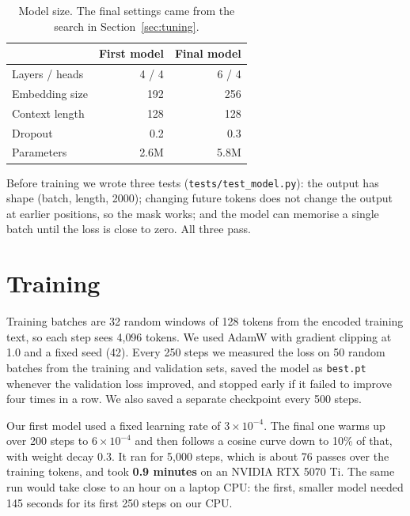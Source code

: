 \documentclass[11pt,a4paper]{article}
\begin{document}
\begin{table}[H]
\centering
\begin{tabular}{lrr}
\toprule
 & First model & Final model \\
\midrule
Layers / heads & 4 / 4 & 6 / 4 \\
Embedding size & 192 & 256 \\
Context length & 128 & 128 \\
Dropout & 0.2 & 0.3 \\
Parameters & 2.6M & 5.8M \\
\bottomrule
\end{tabular}
\caption{Model size. The final settings came from the search in Section~\ref{sec:tuning}.}
\end{table}

Before training we wrote three tests (\texttt{tests/test\_model.py}): the output has shape (batch, length, 2000); changing future tokens does not change the output at earlier positions, so the mask works; and the model can memorise a single batch until the loss is close to zero. All three pass.

\section{Training}

Training batches are 32 random windows of 128 tokens from the encoded training text, so each step sees 4{,}096 tokens. We used AdamW with gradient clipping at 1.0 and a fixed seed (42). Every 250 steps we measured the loss on 50 random batches from the training and validation sets, saved the model as \texttt{best.pt} whenever the validation loss improved, and stopped early if it failed to improve four times in a row. We also saved a separate checkpoint every 500 steps.

Our first model used a fixed learning rate of $3\times10^{-4}$. The final one warms up over 200 steps to $6\times10^{-4}$ and then follows a cosine curve down to 10\% of that, with weight decay 0.3. It ran for 5{,}000 steps, which is about 76 passes over the training tokens, and took \textbf{0.9 minutes} on an NVIDIA RTX 5070 Ti. The same run would take close to an hour on a laptop CPU: the first, smaller model needed 145 seconds for its first 250 steps on our CPU.
\end{document}
